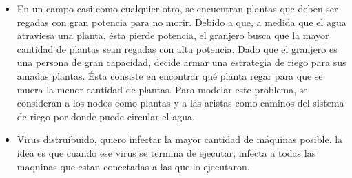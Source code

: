 \begin{itemize}
 
\item En un campo casi como cualquier otro, se encuentran plantas que deben ser regadas con gran potencia para no morir. Debido a que, a medida que el agua atraviesa una planta, ésta pierde potencia, el granjero busca que la mayor cantidad de plantas sean regadas con alta potencia. Dado que el granjero es una persona de gran capacidad, decide armar una estrategia de riego para sus amadas plantas. Ésta consiste en encontrar qué planta regar para que se muera la menor cantidad de plantas. Para modelar este problema, se consideran a los nodos como plantas y a las aristas como caminos del sistema de riego por donde puede circular el agua. %

\item Virus distruibuido, quiero infectar la mayor cantidad de máquinas posible. la idea es que cuando ese virus se termina de ejecutar, infecta a todas las maquinas que estan conectadas a las que lo ejecutaron.

\end{itemize}

